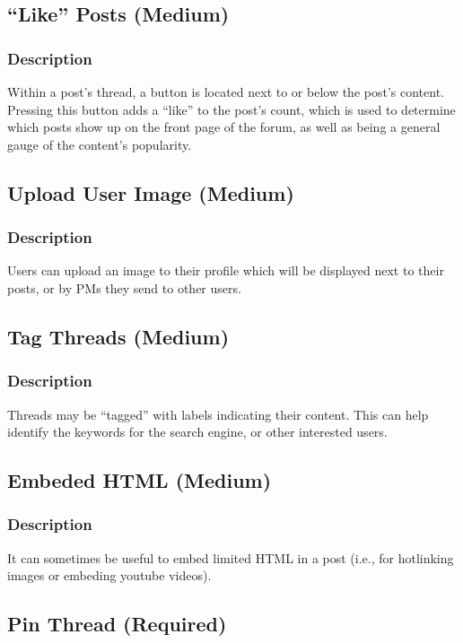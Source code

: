 \documentclass[12pt]{scrartcl}
\begin{document}
\subsection{“Like” Posts (Medium)}
\subsubsection{Description}
Within a post’s thread, a button is located next to or below the post’s content. Pressing this button adds a “like” to the post’s count, which is used to
determine which posts show up on the front page of the forum, as well as being a general gauge of the content’s popularity.

\subsection{Upload User Image (Medium)}
\subsubsection{Description}

Users can upload an image to their profile which will be displayed next to their posts, or by PMs they send to other users.

\subsection{Tag Threads (Medium)}
\subsubsection{Description}

Threads may be ``tagged'' with labels indicating their content. This can help identify the keywords for the search engine, or other interested users.

\subsection{Embeded HTML (Medium)}
\subsubsection{Description}

It can sometimes be useful to embed limited HTML in a post (i.e., for hotlinking images or embeding youtube videos).

\subsection{Pin Thread (Required)}
\end{document}

